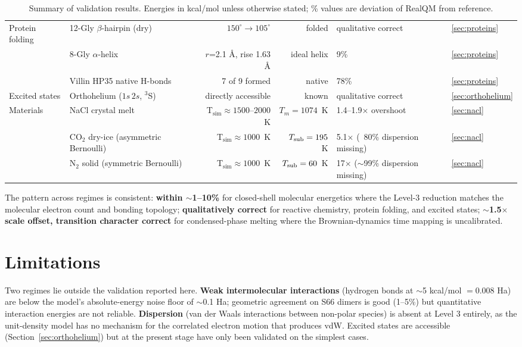 \documentclass[11pt]{article}
\begin{document}
\begin{table}[h!]
\begin{tabular}{l l r r l l}
\midrule
Protein folding        & 12-Gly $\beta$-hairpin (dry)     & $150^\circ \to 105^\circ$ & folded   & qualitative correct  & \ref{sec:proteins}  \\
                       & 8-Gly $\alpha$-helix             & $r$=2.1 \AA, rise 1.63 \AA & ideal helix & 9\%             & \ref{sec:proteins}  \\
                       & Villin HP35 native H-bonds       & 7 of 9 formed         & native       & 78\%                  & \ref{sec:proteins}  \\
\midrule
Excited states         & Orthohelium ($1s\,2s$, $^3$S)    & directly accessible  & known         & qualitative correct & \ref{sec:orthohelium}\\
\midrule
Materials              & NaCl crystal melt              & T$_\mathrm{sim} \approx 1500$--$2000$~K & $T_m = 1074$~K & 1.4--1.9$\times$ overshoot                & \ref{sec:nacl}     \\
                       & CO$_2$ dry-ice (asymmetric Bernoulli) & T$_\mathrm{sim} \approx 1000$~K  & $T_{\rm sub} = 195$~K  & 5.1$\times$ (~80\% dispersion missing)        & \ref{sec:nacl}     \\
                       & N$_2$ solid (symmetric Bernoulli) & T$_\mathrm{sim} \approx 1000$~K  & $T_{\rm sub} = 60$~K   & 17$\times$ ($\sim$99\% dispersion missing)    & \ref{sec:nacl}     \\
\bottomrule
\end{tabular}
\caption{Summary of validation results. Energies in kcal/mol unless otherwise stated; \% values are deviation of RealQM from reference.}
\label{tab:summary}
\end{table}

The pattern across regimes is consistent: \textbf{within $\sim$1--10\%} for closed-shell molecular energetics where the Level-3 reduction matches the molecular electron count and bonding topology; \textbf{qualitatively correct} for reactive chemistry, protein folding, and excited states; \textbf{$\sim$1.5$\times$ scale offset, transition character correct} for condensed-phase melting where the Brownian-dynamics time mapping is uncalibrated.

\section{Limitations}\label{sec:limitations}

Two regimes lie outside the validation reported here. \textbf{Weak intermolecular interactions} (hydrogen bonds at $\sim$5 kcal/mol $= 0.008$ Ha) are below the model's absolute-energy noise floor of $\sim$0.1 Ha; geometric agreement on S66 dimers is good (1--5\%) but quantitative interaction energies are not reliable. \textbf{Dispersion} (van der Waals interactions between non-polar species) is absent at Level 3 entirely, as the unit-density model has no mechanism for the correlated electron motion that produces vdW. Excited states are accessible (Section~\ref{sec:orthohelium}) but at the present stage have only been validated on the simplest cases.
\end{document}
